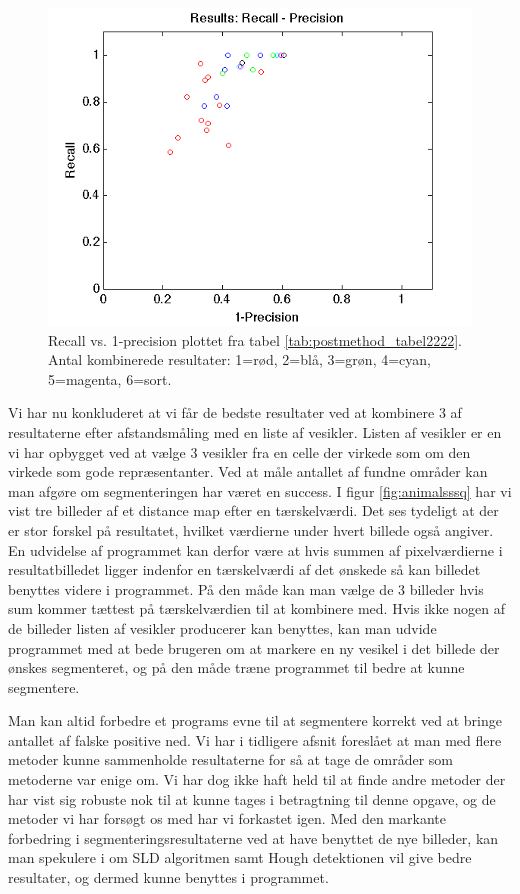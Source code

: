 \begin{figure}[H]
	\centering
	\includegraphics[scale=0.9]{files/postmethod/img/recallvsprecision2.png}
	\caption{Recall vs. 1-precision plottet fra tabel \ref{tab:postmethod_tabel2222}. Antal kombinerede resultater: 1=rød, 2=blå, 3=grøn, 4=cyan, 5=magenta, 6=sort. \label{fig:postmethod_recallprec2}}
\end{figure}

Vi har nu konkluderet at vi får de bedste resultater ved at kombinere 3 af resultaterne efter afstandsmåling med en liste af vesikler. Listen af vesikler er en vi har opbygget ved at vælge 3 vesikler fra en celle der virkede som om den virkede som gode repræsentanter. Ved at måle antallet af fundne områder kan man afgøre om segmenteringen har været en success. I figur \ref{fig:animalsssq} har vi vist tre billeder af et distance map efter en tærskelværdi. Det ses tydeligt at der er stor forskel på resultatet, hvilket værdierne under hvert billede også angiver. En udvidelse af programmet kan derfor være at hvis summen af pixelværdierne i resultatbilledet ligger indenfor en tærskelværdi af det ønskede så kan billedet benyttes videre i programmet. På den måde kan man vælge de 3 billeder hvis sum kommer tættest på tærskelværdien til at kombinere med. Hvis ikke nogen af de billeder listen af vesikler producerer kan benyttes, kan man udvide programmet med at bede brugeren om at markere en ny vesikel i det billede der ønskes segmenteret, og på den måde træne programmet til bedre at kunne segmentere. 

Man kan altid forbedre et programs evne til at segmentere korrekt ved at bringe antallet af falske positive ned. Vi har i tidligere afsnit foreslået at man med flere metoder kunne sammenholde resultaterne for så at tage de områder som metoderne var enige om. Vi har dog ikke haft held til at finde andre metoder der har vist sig robuste nok til at kunne tages i betragtning til denne opgave, og de metoder vi har forsøgt os med har vi forkastet igen. Med den markante forbedring i segmenteringsresultaterne ved at have benyttet de nye billeder, kan man spekulere i om SLD algoritmen samt Hough detektionen vil give bedre resultater, og dermed kunne benyttes i programmet. 

